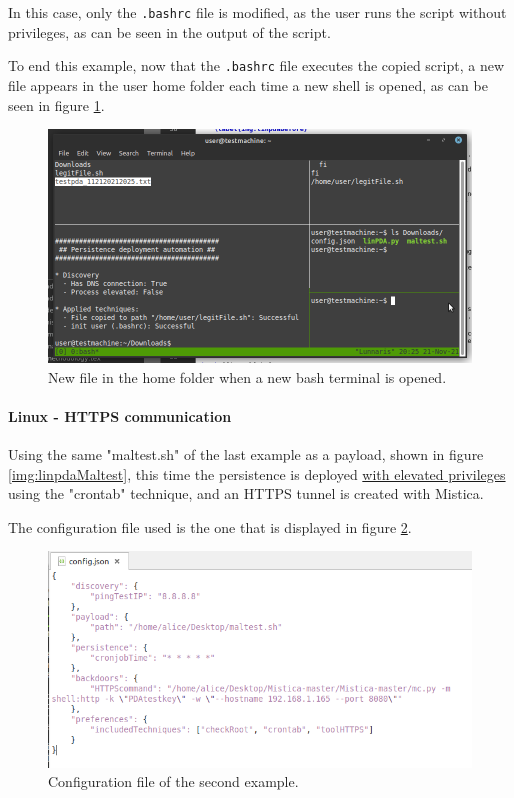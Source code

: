 In this case, only the \texttt{.bashrc} file is modified, as the user runs the script without privileges, as can be seen in the output of the script.

To end this example, now that the \texttt{.bashrc} file executes the copied script, a new file appears in the user home folder each time a new shell is opened, as can be seen in figure \ref{img:linpdaConsequences}.

\begin{figure}[!ht]
	\centering
	\includegraphics[width=14cm,trim={0.5cm 1cm 0.5cm 0.5cm},clip]{img/linPDA-consequences}
	\caption{New file in the home folder when a new bash terminal is opened.}
	\label{img:linpdaConsequences}
\end{figure}


\paragraph{Linux - HTTPS communication}
Using the same "maltest.sh" of the last example as a payload, shown in figure \ref{img:linpdaMaltest}, this time the persistence is deployed \underline{with elevated privileges} using the "crontab" technique, and an HTTPS tunnel is created with Mistica\cite{Mistica}.

The configuration file used is the one that is displayed in figure \ref{img:newlinPDAconfig}.

\begin{figure}[!ht]
	\centering
	\includegraphics[width=14cm]{img/newlinPDA-config}
	\caption{Configuration file of the second example.}
	\label{img:newlinPDAconfig}
\end{figure}

